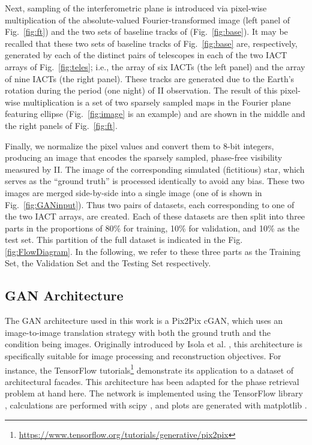 Next, sampling of the interferometric plane is introduced via pixel-wise multiplication of the absolute-valued Fourier-transformed image (left panel of Fig.~\ref{fig:ft}) and the two sets of baseline tracks of (Fig.~\ref{fig:base}). It may be recalled that these two sets of baseline tracks of Fig.~\ref{fig:base} are, respectively, generated by each of the distinct pairs of telescopes in each of the two IACT arrays of Fig.~\ref{fig:teles}; i.e., the array of six IACTs (the left panel) and the array of nine IACTs (the right panel). These tracks are generated due to the Earth's rotation during the period (one night) of II observation. The result of this pixel-wise multiplication is a set of two sparsely sampled maps in the Fourier plane featuring ellipse (Fig.~\ref{fig:image} is an example) and are shown in the middle and the right panels of Fig.~\ref{fig:ft}.

Finally, we normalize the pixel values and convert them to 8-bit integers, producing an image that encodes the sparsely sampled, phase-free visibility measured by II. The image of the corresponding simulated (fictitious) star, which serves as the ``ground truth'' is processed identically to avoid any bias. These two images are merged side-by-side into a single 
image (one of is shown in Fig.~\ref{fig:GANinput}). Thus two pairs of datasets, each corresponding to one of the two IACT arrays, are created. Each of these datasets are then split into three parts in the proportions of 80\% for training, 10\% for validation, and 10\% as the test set. This partition of the full dataset is indicated in the Fig.\ref{fig:FlowDiagram}. In the following, we refer to these three parts as the Training Set, the Validation Set and the Testing Set respectively.

\subsection{GAN Architecture}
The GAN architecture used in this work is a Pix2Pix cGAN, which uses an image-to-image translation strategy with both the ground truth and the condition being images. Originally introduced by Isola et al. \citep{isola2017image}, this architecture is specifically suitable for image processing and reconstruction objectives. For instance, the TensorFlow tutorials\footnote{\url{https://www.tensorflow.org/tutorials/generative/pix2pix}} demonstrate its application to a dataset of architectural facades. This architecture has been adapted
for the phase retrieval problem at hand here. The network is implemented using the TensorFlow library \citep{abadi2016tensorflow}, calculations are performed with scipy \citep{virtanen2020scipy}, and plots are generated with matplotlib \citep{4160265}.

